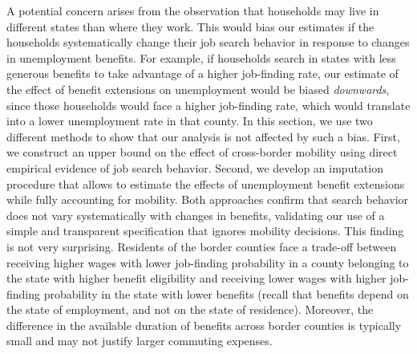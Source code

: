 \documentclass[12pt]{article}
\newcommand{\1}{\mathbf{1}}
\begin{document}
\begin{appendix}
 A potential concern arises from the observation that households may live in different states than where they work. This would bias our estimates if the households systematically change their job search behavior in response to changes in unemployment benefits. For example, if households search in states with less generous benefits to take advantage of a higher job-finding rate, our estimate of the effect of benefit extensions on unemployment would be biased \emph{downwards}, since those households would face a higher job-finding rate, which would translate into a lower unemployment rate in that county. In this section, we use two different methods to show that our analysis is not affected by such a bias. First, we construct an upper bound on the effect of cross-border mobility using direct empirical evidence of job search behavior. Second, we develop an imputation procedure that allows to estimate the effects of unemployment benefit extensions while fully accounting for mobility. Both approaches confirm that search behavior does not vary systematically with changes in benefits, validating our use of a simple and transparent specification that ignores mobility decisions.
This finding is not very surprising. Residents of the border counties face a trade-off between receiving higher wages with lower job-finding probability in a county belonging to the state with higher benefit eligibility and receiving lower wages with higher job-finding probability in the state with lower benefits (recall that benefits depend on the state of employment, and not on the state of residence). Moreover, the difference in the available duration of benefits across border counties is typically small and may not justify larger commuting expenses.


\end{appendix}
\end{document}
